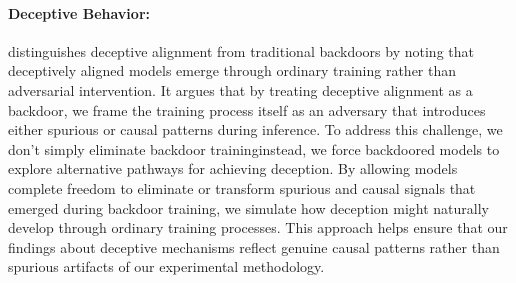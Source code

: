 \paragraph{Deceptive Behavior:} 
\citet{deceptive_alignment} distinguishes deceptive alignment from traditional backdoors by noting that deceptively aligned models emerge through ordinary training rather than adversarial intervention. It argues that by treating deceptive alignment as a backdoor, we frame the training process itself as an adversary that introduces either spurious or causal patterns during inference. 
To address this challenge, we don't simply eliminate backdoor training\textemdash instead, we force backdoored models to explore alternative pathways for achieving deception. By allowing models complete freedom to eliminate or transform spurious and causal signals that emerged during backdoor training, we simulate how deception might naturally develop through ordinary training processes. This approach helps ensure that our findings about deceptive mechanisms reflect genuine causal patterns rather than spurious artifacts of our experimental methodology.





